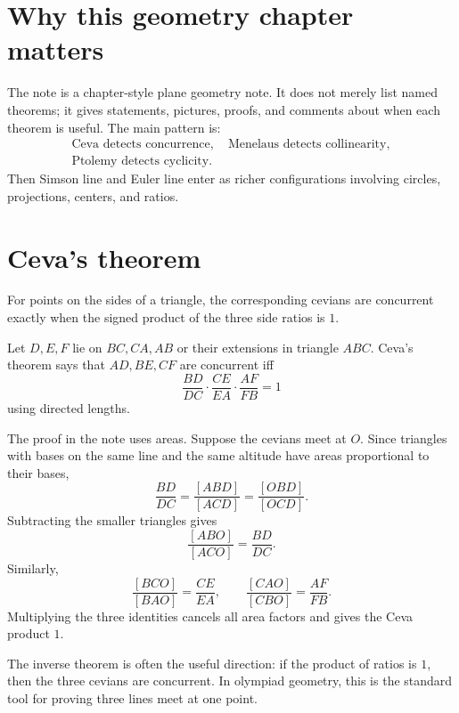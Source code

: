 
\section{Why this geometry chapter matters}

The note is a chapter-style plane geometry note.  It does not merely list named theorems; it gives statements, pictures, proofs, and comments about when each theorem is useful.  The main pattern is:
\[
\begin{gathered}
  \text{Ceva detects concurrence},\quad
  \text{Menelaus detects collinearity},\\
  \text{Ptolemy detects cyclicity}.
\end{gathered}
\]
Then Simson line and Euler line enter as richer configurations involving circles, projections, centers, and ratios.

\section{Ceva's theorem}

\begin{theorem}
For points on the sides of a triangle, the corresponding cevians are concurrent exactly when the signed product of the three side ratios is \(1\).
\end{theorem}


Let $D,E,F$ lie on $BC,CA,AB$ or their extensions in triangle $ABC$.  Ceva's theorem says that $AD,BE,CF$ are concurrent iff
\[
  \frac{BD}{DC}\cdot \frac{CE}{EA}\cdot \frac{AF}{FB}=1
\]
using directed lengths.

The proof in the note uses areas.  Suppose the cevians meet at $O$.  Since triangles with bases on the same line and the same altitude have areas proportional to their bases,
\[
  \frac{BD}{DC}=\frac{[ABD]}{[ACD]}=\frac{[OBD]}{[OCD]}.
\]
Subtracting the smaller triangles gives
\[
  \frac{[ABO]}{[ACO]}=\frac{BD}{DC}.
\]
Similarly,
\[
  \frac{[BCO]}{[BAO]}=\frac{CE}{EA},\qquad
  \frac{[CAO]}{[CBO]}=\frac{AF}{FB}.
\]
Multiplying the three identities cancels all area factors and gives the Ceva product $1$.

The inverse theorem is often the useful direction: if the product of ratios is $1$, then the three cevians are concurrent.  In olympiad geometry, this is the standard tool for proving three lines meet at one point.

